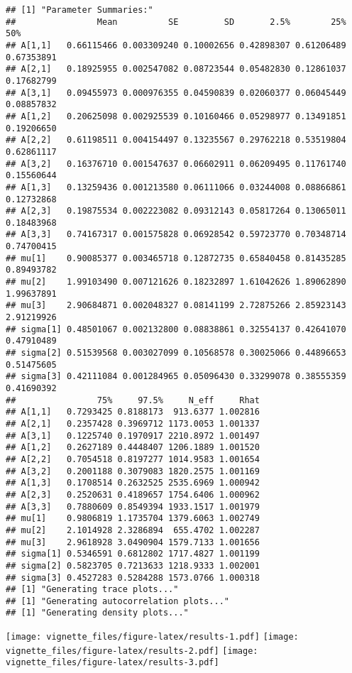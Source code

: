 \documentclass[
]{article}
\begin{document}
\begin{verbatim}
## [1] "Parameter Summaries:"
##                Mean          SE         SD       2.5%        25%        50%
## A[1,1]   0.66115466 0.003309240 0.10002656 0.42898307 0.61206489 0.67353891
## A[2,1]   0.18925955 0.002547082 0.08723544 0.05482830 0.12861037 0.17682799
## A[3,1]   0.09455973 0.000976355 0.04590839 0.02060377 0.06045449 0.08857832
## A[1,2]   0.20625098 0.002925539 0.10160466 0.05298977 0.13491851 0.19206650
## A[2,2]   0.61198511 0.004154497 0.13235567 0.29762218 0.53519804 0.62861117
## A[3,2]   0.16376710 0.001547637 0.06602911 0.06209495 0.11761740 0.15560644
## A[1,3]   0.13259436 0.001213580 0.06111066 0.03244008 0.08866861 0.12732868
## A[2,3]   0.19875534 0.002223082 0.09312143 0.05817264 0.13065011 0.18483968
## A[3,3]   0.74167317 0.001575828 0.06928542 0.59723770 0.70348714 0.74700415
## mu[1]    0.90085377 0.003465718 0.12872735 0.65840458 0.81435285 0.89493782
## mu[2]    1.99103490 0.007121626 0.18232897 1.61042626 1.89062890 1.99637891
## mu[3]    2.90684871 0.002048327 0.08141199 2.72875266 2.85923143 2.91219926
## sigma[1] 0.48501067 0.002132800 0.08838861 0.32554137 0.42641070 0.47910489
## sigma[2] 0.51539568 0.003027099 0.10568578 0.30025066 0.44896653 0.51475605
## sigma[3] 0.42111084 0.001284965 0.05096430 0.33299078 0.38555359 0.41690392
##                75%     97.5%     N_eff     Rhat
## A[1,1]   0.7293425 0.8188173  913.6377 1.002816
## A[2,1]   0.2357428 0.3969712 1173.0053 1.001337
## A[3,1]   0.1225740 0.1970917 2210.8972 1.001497
## A[1,2]   0.2627189 0.4448407 1206.1889 1.001520
## A[2,2]   0.7054518 0.8197277 1014.9583 1.001654
## A[3,2]   0.2001188 0.3079083 1820.2575 1.001169
## A[1,3]   0.1708514 0.2632525 2535.6969 1.000942
## A[2,3]   0.2520631 0.4189657 1754.6406 1.000962
## A[3,3]   0.7880609 0.8549394 1933.1517 1.001979
## mu[1]    0.9806819 1.1735704 1379.6063 1.002749
## mu[2]    2.1014928 2.3286894  655.4702 1.002287
## mu[3]    2.9618928 3.0490904 1579.7133 1.001656
## sigma[1] 0.5346591 0.6812802 1717.4827 1.001199
## sigma[2] 0.5823705 0.7213633 1218.9333 1.002001
## sigma[3] 0.4527283 0.5284288 1573.0766 1.000318
## [1] "Generating trace plots..."
## [1] "Generating autocorrelation plots..."
## [1] "Generating density plots..."
\end{verbatim}

\texttt{[image: vignette\_files/figure-latex/results-1.pdf]}
\texttt{[image: vignette\_files/figure-latex/results-2.pdf]}
\texttt{[image: vignette\_files/figure-latex/results-3.pdf]}
\end{document}
